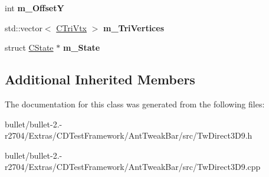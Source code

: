 \begin{DoxyCompactItemize}
\item 
\hypertarget{class_c_tw_graph_direct3_d9_a956c99ba4fe4f6629f1b2fc977fff85d}{int {\bfseries m\+\_\+\+Offset\+Y}}\label{class_c_tw_graph_direct3_d9_a956c99ba4fe4f6629f1b2fc977fff85d}

\item 
\hypertarget{class_c_tw_graph_direct3_d9_a18d48d7e63d1081f88ccb65fb492ce53}{std\+::vector$<$ \hyperlink{struct_c_tw_graph_direct3_d9_1_1_c_tri_vtx}{C\+Tri\+Vtx} $>$ {\bfseries m\+\_\+\+Tri\+Vertices}}\label{class_c_tw_graph_direct3_d9_a18d48d7e63d1081f88ccb65fb492ce53}

\item 
\hypertarget{class_c_tw_graph_direct3_d9_accb8e7b53ce88f95dc5a3939a170d418}{struct \hyperlink{struct_c_state}{C\+State} $\ast$ {\bfseries m\+\_\+\+State}}\label{class_c_tw_graph_direct3_d9_accb8e7b53ce88f95dc5a3939a170d418}

\end{DoxyCompactItemize}
\subsection*{Additional Inherited Members}


The documentation for this class was generated from the following files\+:\begin{DoxyCompactItemize}
\item 
bullet/bullet-\/2.-\/r2704/\+Extras/\+C\+D\+Test\+Framework/\+Ant\+Tweak\+Bar/src/Tw\+Direct3\+D9.\+h\item 
bullet/bullet-\/2.-\/r2704/\+Extras/\+C\+D\+Test\+Framework/\+Ant\+Tweak\+Bar/src/Tw\+Direct3\+D9.\+cpp\end{DoxyCompactItemize}
